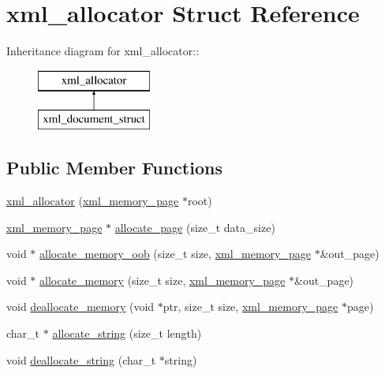 \hypertarget{structxml__allocator}{
\section{xml\_\-allocator Struct Reference}
\label{structxml__allocator}
}
Inheritance diagram for xml\_\-allocator::\begin{figure}[H]
\begin{center}
\leavevmode
\includegraphics[height=2cm]{structxml__allocator}
\end{center}
\end{figure}
\subsection*{Public Member Functions}
\begin{DoxyCompactItemize}
\item 
\hyperlink{structxml__allocator_ad41b1a18595953aa71a470b45921c0fd}{xml\_\-allocator} (\hyperlink{structxml__memory__page}{xml\_\-memory\_\-page} $\ast$root)
\item 
\hyperlink{structxml__memory__page}{xml\_\-memory\_\-page} $\ast$ \hyperlink{structxml__allocator_a4b399b01e530220ec5849b912b84063b}{allocate\_\-page} (size\_\-t data\_\-size)
\item 
void $\ast$ \hyperlink{structxml__allocator_a30bb557bc040de54c041c6d3dca6772e}{allocate\_\-memory\_\-oob} (size\_\-t size, \hyperlink{structxml__memory__page}{xml\_\-memory\_\-page} $\ast$\&out\_\-page)
\item 
void $\ast$ \hyperlink{structxml__allocator_afac0b9fac2c2962972f60d0346eb4f39}{allocate\_\-memory} (size\_\-t size, \hyperlink{structxml__memory__page}{xml\_\-memory\_\-page} $\ast$\&out\_\-page)
\item 
void \hyperlink{structxml__allocator_a5df417155487cce4e0460b123ac33dc6}{deallocate\_\-memory} (void $\ast$ptr, size\_\-t size, \hyperlink{structxml__memory__page}{xml\_\-memory\_\-page} $\ast$page)
\item 
char\_\-t $\ast$ \hyperlink{structxml__allocator_ac5ec2b5d41672d6494a2742e95e525b3}{allocate\_\-string} (size\_\-t length)
\item 
void \hyperlink{structxml__allocator_af32c538db4d562c2d0bfe15f7c0aa879}{deallocate\_\-string} (char\_\-t $\ast$string)
\end{DoxyCompactItemize}
